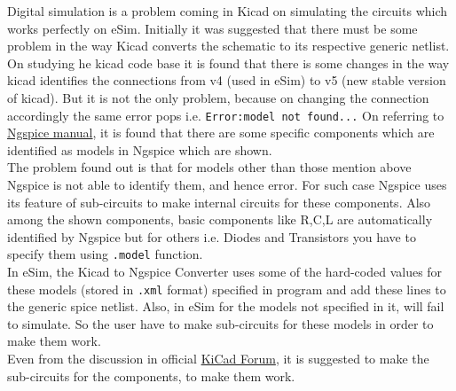 \documentclass[12pt,a4paper]{report}
\begin{document}
Digital simulation is a problem coming in Kicad on simulating the circuits which works perfectly on eSim. Initially it was suggested that there must be some problem in the way Kicad converts the schematic to its respective generic netlist. On studying he kicad code base it is found that there is some changes in the way kicad identifies the connections from v4 (used in eSim) to v5 (new stable version of kicad). But it is not the only problem, because on changing the connection accordingly the same error pops i.e. \texttt{Error:model not found...} On referring to \href{http://ngspice.sourceforge.net/docs/ngspice-manual.pdf}{Ngspice manual}, it is found that there are some specific components which are identified as models in Ngspice which are shown.
\vspace{5mm}
\\
The problem found out is that for models other than those mention above Ngspice is not able to identify them, and hence error. For such case Ngspice uses its feature of sub-circuits to make internal circuits for these components. Also among the shown components, basic components like R,C,L are automatically identified by Ngspice but for others i.e. Diodes and Transistors you have to specify them using \texttt{.model} function.
\vspace{5mm}
\\
In eSim, the Kicad to Ngspice Converter uses some of the hard-coded values for these models (stored in \texttt{.xml} format) specified in program and add these lines to the generic spice netlist. Also, in eSim for the models not specified in it, will fail to simulate. So the user have to make sub-circuits for these models in order to make them work.
\vspace{5mm}
\\
Even from the discussion in official \href{https://forum.kicad.info/t/digital-simulation/11072}{KiCad Forum}, it is suggested to make the sub-circuits for the components, to make them work.
\end{document}
